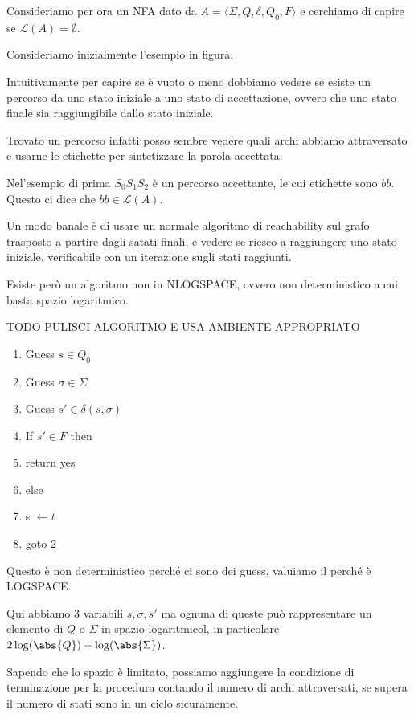 Consideriamo per ora un NFA dato da \(A = \langle \Sigma,Q,\delta,Q_0,F\rangle\) e cerchiamo di capire se \(\mathcal{L}(A) = \emptyset\).

Consideriamo inizialmente l'esempio in figura.


Intuitivamente per capire se è vuoto o meno dobbiamo vedere se esiste un percorso da uno stato iniziale a uno stato di accettazione, ovvero che uno stato finale sia raggiungibile dallo stato iniziale.

Trovato un percorso infatti posso sembre vedere quali archi abbiamo attraversato e usarne le etichette per sintetizzare la parola accettata.

Nel'esempio di prima \(S_0 S_1 S_2\) è un percorso accettante, le cui etichette sono \(bb\). Questo ci dice che \(bb\in \mathcal{L}(A)\).

Un modo banale è di usare un normale algoritmo di reachability sul grafo trasposto a partire dagli satati finali, e vedere se riesco a raggiungere uno stato iniziale, verificabile con un iterazione sugli stati raggiunti.

Esiste però un algoritmo non in NLOGSPACE, ovvero non deterministico a cui basta spazio logaritmico.

TODO PULISCI ALGORITMO E USA AMBIENTE APPROPRIATO

\begin{enumerate}
  \item Guess \(s \in Q_0\)
  \item Guess \(\sigma \in \Sigma\)
  \item Guess \(s' \in \delta(s,\sigma)\)
  \item If \(s' \in F\) then
  \item return yes
  \item else
  \item s \(\gets t\)
  \item goto 2
\end{enumerate}

Questo è non deterministico perché ci sono dei guess, valuiamo il perché è LOGSPACE\@.

Qui abbiamo 3 variabili \(s, \sigma, s'\) ma ognuna di queste può rappresentare un elemento di \(Q\) o \(\Sigma\) in spazio logaritmicol, in particolare \(2\log(\abs{Q}) + \log(\abs{\Sigma})\).

Sapendo che lo spazio è limitato, possiamo aggiungere la condizione di terminazione per la procedura contando il numero di archi attraversati, se supera il numero di stati sono in un ciclo sicuramente.

